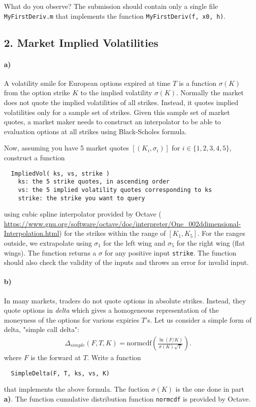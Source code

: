 \documentclass[12pt,a4paper,hidelinks,fleqn]{article}            %
\begin{document}
What do you observe? The submission should contain only a single file \verb=MyFirstDeriv.m= that implements the function \verb=MyFirstDeriv(f, x0, h)=.
 
\subsection*{2. Market Implied Volatilities}

\paragraph{a)} A volatility smile for European options expired at time $T$ is a function $\sigma(K)$ from the option strike $K$ to the implied volatility $\sigma(K)$.
Normally the market does not quote the implied volatilities of all strikes.
Instead, it quotes implied volatilities only for a sample set of strikes. 
Given this sample set of market quotes, 
a market maker needs to construct an interpolator to be able to evaluation options at all strikes using Black-Scholes formula.

Now, assuming you have 5 market quotes $[(K_i, \sigma_i)]$ for $i\in\{1, 2, 3, 4, 5\}$,
construct a function 
\vspace{-0.6cm}
\begin{verbatim}
  ImpliedVol( ks, vs, strike )
    ks: the 5 strike quotes, in ascending order
    vs: the 5 implied volatility quotes corresponding to ks
    strike: the strike you want to query
\end{verbatim}
\vspace{-0.6cm}
using cubic spline interpolator provided by Octave (
\url{https://www.gnu.org/software/octave/doc/interpreter/One_002ddimensional-Interpolation.html})
for the strikes within the range of $[K_1, K_5]$. For the ranges outside, we extrapolate using $\sigma_1$ for the left wing and $\sigma_5$ for the right wing (flat wings).
The function returns a $\sigma$ for any positive input \verb=strike=.
The function should also check the validity of the inputs and throws an error for invalid input.

\paragraph{b)}
In many markets, traders do not quote options in absolute strikes. 
Instead, they quote options in \emph{delta} which gives a homogeneous representation of the moneyness of the options for various expiries $T$'s.
Let us consider a simple form of delta, "simple call delta":
\begin{align*}
\Delta_{simple} (F, T, K) = \text{normcdf}\left( \frac{\ln(F/K)}{\sigma(K) \sqrt T} \right).
\end{align*}
where $F$ is the forward at $T$. 
Write a function 
\vspace{-6mm}
\begin{verbatim}
  SimpleDelta(F, T, ks, vs, K)
\end{verbatim}
\vspace{-6mm}
that implements the above formula. The fuction $\sigma(K)$ is the one done in part \textbf{a)}. 
The function cumulative distribution function \verb=normcdf= is provided by Octave.
 
\end{document}
